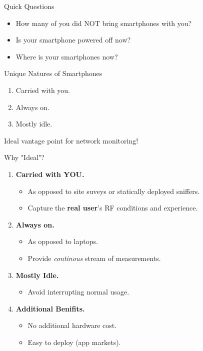 \begin{frame}{Quick Questions}
  \begin{itemize}
    \item How many of you did NOT bring smartphones with you?
    \item Is your smartphone powered off now?
    \item Where is your smartphones now?
  \end{itemize}
  \begin{block}{Unique Natures of Smartphones}
    \begin{enumerate}
      \item Carried with you.
      \item Always on.
      \item Mostly idle.
    \end{enumerate}
  \end{block}
  \vspace*{5mm}
  {\LARGE Ideal vantage point for network monitoring!}
\end{frame}

\begin{frame}{Why "Ideal"?}
  \begin{enumerate}
    \item \textbf{Carried with YOU.}
      \begin{itemize}
        \item As opposed to site suveys or statically deployed sniffers.
        \item Capture the \textbf{real user}'s RF conditions and experience.
      \end{itemize}
    \item \textbf{Always on.}
      \begin{itemize}
        \item As opposed to laptops.
        \item Provide \textit{continous} stream of measurements.
      \end{itemize}
    \item \textbf{Mostly Idle.}
      \begin{itemize}
        \item Avoid interrupting normal usage.
      \end{itemize}
    \item \textbf{Additional Benifits.}
      \begin{itemize}
        \item No additional hardware cost.
        \item Easy to deploy (app markets).
      \end{itemize}
  \end{enumerate}
\end{frame}

